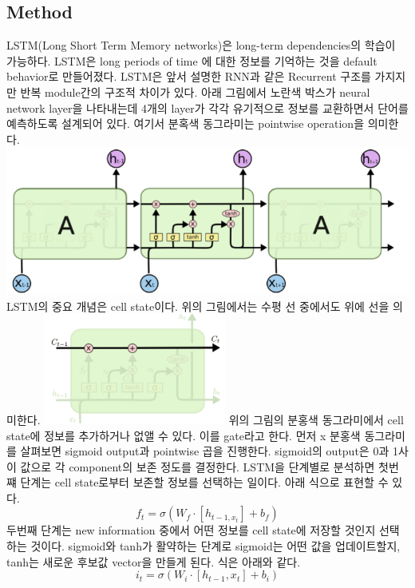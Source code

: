 \documentclass[extendedabs]{bmvc2k}
\begin{document}
 \subsection{Method}
 \quad LSTM(Long Short Term Memory networks)은 long-term dependencies의 학습이 가능하다. 
 LSTM은 long periods of time 에 대한 정보를 기억하는 것을 default behavior로 만들어졌다. 
 LSTM은 앞서 설명한 RNN과 같은 Recurrent 구조를 가지지만 반복 module간의 구조적 차이가 있다. 
 아래 그림에서 노란색 박스가 neural network layer을 나타내는데 4개의 layer가 각각 유기적으로 정보를 교환하면서
 단어를 예측하도록 설계되어 있다. 여기서 분혹색 동그라미는 pointwise operation을 의미한다.
 \newline  \includegraphics[width=\linewidth]{images/04_language.PNG}
 LSTM의 중요 개념은 cell state이다. 위의 그림에서는 수평 선 중에서도 위에 선을 의미한다.
 \newline  \includegraphics[width=6cm]{images/05_language.PNG}
 \newline 위의 그림의 분홍색 동그라미에서 cell state에 정보를 추가하거나 없앨 수 있다. 이를 gate라고 한다.
 먼저 x 분홍색 동그라미를 살펴보면 sigmoid output과 pointwise 곱을 진행한다.
 sigmoid의 output은 0과 1사이 값으로 각 component의 보존 정도를 결정한다. 
 \newline LSTM을 단계별로 분석하면 첫번쨰 단계는 cell state로부터 보존할 정보를 선택하는 일이다. 아래 식으로 표현할 수 있다.
 $$f_t = \sigma ( W_f \cdot [h_{t-1,x_t}] + b_f)$$
 두번째 단계는 new information 중에서 어떤 정보를 cell state에 저장할 것인지 선택하는 것이다. 
 sigmoid와 tanh가 활약하는 단계로 sigmoid는 어떤 값을 업데이트할지, tanh는 새로운 후보값 vector을 만들게 된다.
 식은 아래와 같다.
 $$ i_t = \sigma(W_i \cdot [ h_{t-1},x_t] + b_i) $$
\end{document}
